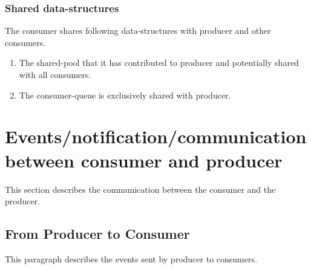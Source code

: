 \documentclass[a4paper,twoside]{report} %
\begin{document}
\subsubsection{Shared data-structures}
The consumer shares following data-structures with producer and other
consumers.
\begin{enumerate}
  \item The shared-pool that it has contributed to producer and
  potentially shared with all consumers. 
  \item The consumer-queue is exclusively shared with producer. 
\end{enumerate}



\section{Events/notification/communication between consumer and
producer}
This section describes the communication between the consumer and the
producer.  

\subsection{From Producer to Consumer}
This paragraph describes the events sent by producer to
consumers.
\end{document}
